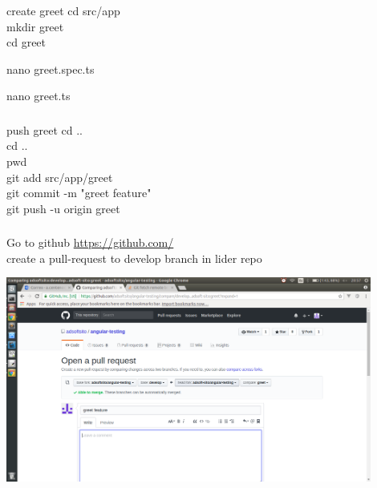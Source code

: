 \documentclass{beamer}
\begin{document}
\begin{frame}\frametitle{} 

\begin{block}{create greet}
cd src/app \\
mkdir greet \\
cd greet
\end{block}

\begin{block}{nano greet.spec.ts}
\lstspec
\end{block}

\begin{block}{nano greet.ts}
\lstts
\end{block}

\end{frame}




\begin{frame}\frametitle{} 


\begin{block}{push greet}
cd .. \\
cd .. \\
pwd  \\
git add src/app/greet \\
git commit -m "greet feature" \\
git push -u origin greet \\
\end{block}


\end{frame}

\begin{frame}\frametitle{} 

\begin{block}{Go to github}
\url{https://github.com/} \\

create a pull-request to develop branch in lider repo
\end{block}

\begin{center}
\includegraphics[width=0.9\textwidth]{pull-request.png}
\end{center}


\end{frame}
\end{document}
